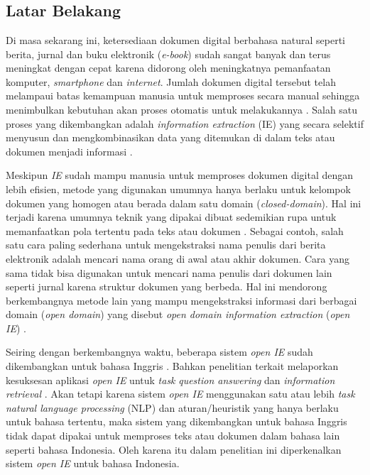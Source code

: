 \chapter{\babSatu}
\label{chap:babSatu}

\section{Latar Belakang}
Di masa sekarang ini, ketersediaan dokumen digital berbahasa natural seperti berita, jurnal dan buku elektronik (\textit{e-book}) sudah sangat banyak dan terus meningkat dengan cepat karena didorong oleh meningkatnya pemanfaatan komputer, \textit{smartphone} dan \textit{internet}. Jumlah dokumen digital tersebut telah melampaui batas kemampuan manusia untuk memproses secara manual sehingga menimbulkan kebutuhan akan proses otomatis untuk melakukannya \citep{banko2007open}. Salah satu proses yang dikembangkan adalah \textit{information extraction} (IE) yang secara selektif menyusun dan mengkombinasikan data yang ditemukan di dalam teks atau dokumen menjadi informasi \citep{cowie1996information}.

Meskipun \textit{IE} sudah mampu manusia untuk memproses dokumen digital dengan lebih efisien, metode yang digunakan umumnya hanya berlaku untuk kelompok dokumen yang homogen atau berada dalam satu domain (\textit{closed-domain}). Hal ini terjadi karena umumnya teknik yang dipakai dibuat sedemikian rupa untuk memanfaatkan pola tertentu pada teks atau dokumen \citep{cowie1996information}. Sebagai contoh, salah satu cara paling sederhana untuk mengekstraksi nama penulis dari berita elektronik adalah mencari nama orang di awal atau akhir dokumen. Cara yang sama tidak bisa digunakan untuk mencari nama penulis dari dokumen lain seperti jurnal karena struktur dokumen yang berbeda. Hal ini mendorong berkembangnya metode lain yang mampu mengekstraksi informasi dari berbagai domain (\textit{open domain}) yang disebut \textit{open domain information extraction} (\textit{open IE}) \citep{banko2007open}.

Seiring dengan berkembangnya waktu, beberapa sistem \textit{open IE} sudah dikembangkan untuk bahasa Inggris \citep{banko2007open,schmitz2012open,angeli2015leveraging}. Bahkan penelitian terkait melaporkan kesuksesan aplikasi \textit{open IE} untuk \textit{task} \textit{question answering} \citep{fader2011identifying} dan \textit{information retrieval} \citep{etzioni2011search}. Akan tetapi karena sistem \textit{open IE} menggunakan satu atau lebih \textit{task natural language processing} (NLP) dan aturan/heuristik yang hanya berlaku untuk bahasa tertentu, maka sistem yang dikembangkan untuk bahasa Inggris tidak dapat dipakai untuk memproses teks atau dokumen dalam bahasa lain seperti bahasa Indonesia. Oleh karena itu dalam penelitian ini diperkenalkan sistem \textit{open IE} untuk bahasa Indonesia.

